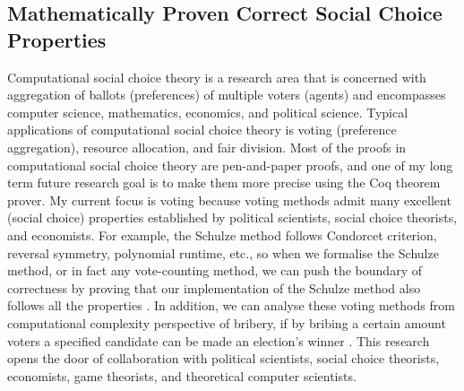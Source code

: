 \documentclass[a4paper]{article}
\begin{document}
\subsection{Mathematically Proven Correct Social Choice Properties}
Computational social choice theory is a research area that is concerned
with aggregation of ballots (preferences)  of multiple voters (agents) and encompasses 
computer science, mathematics, economics, and political science. Typical applications of 
computational social choice theory is voting (preference aggregation), resource allocation, and fair division.
Most of the proofs in computational social choice theory are pen-and-paper proofs, 
and one of my long term future research goal is to make them more precise using the Coq theorem prover.
My current focus is voting because voting methods admit many excellent (social choice) properties
established by political scientists, social choice theorists, 
and economists. For example, the Schulze method follows Condorcet criterion, reversal symmetry,
polynomial runtime, etc., so when we formalise the Schulze method, or in fact any vote-counting method, 
we can push the boundary of correctness by proving that our 
implementation of the Schulze method also follows all the properties \cite{tiwari2021machine}. 
In addition, we can analyse these voting
methods from computational complexity perspective of bribery, if by bribing a certain amount 
voters a specified candidate can be made an election's winner \cite{faliszewski2006complexity}. 
This research opens the door of collaboration with political scientists, 
social choice theorists, economists, game theorists, and theoretical 
computer scientists.


 
\end{document}
